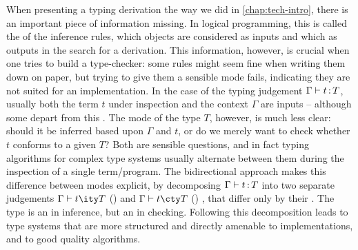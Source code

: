 
When presenting a typing derivation the way we did in \cref{chap:tech-intro}, there is
an important piece of information missing.
In logical programming, this is called the  of the inference rules,
\ie which objects are considered as inputs and which as outputs in the search
for a derivation.
This information, however, is crucial when one tries to build a type-checker:
some rules might seem fine when writing them down on paper, but trying to give them a
sensible mode fails, indicating they are not suited for an implementation.
In the case of the typing judgement $\Gamma \vdash t \operatorname{\mathrel{:}} T$,
usually both the term $t$ under inspection and the context $\Gamma$ are inputs –
although some depart from this .
The mode of the type $T$, however, is much less clear: should it be inferred based upon
$\Gamma$ and $t$, or do we merely want to check whether $t$ conforms to a given $T$?
Both are sensible questions, and in fact typing algorithms for complex type systems usually 
alternate between them during the inspection of a single term/program.
\AP The bidirectional approach makes this difference between modes explicit,
by decomposing %
$\Gamma \vdash t \operatorname{\mathrel{:}} T$ into two separate judgements $\inferty{\Gamma}{t}{T}$
() and $\checkty{\Gamma}{t}{T}$ ()%
,
that differ only by their . The type is an
 in inference, but an  in checking.
Following this decomposition%
%
%
leads to type systems that are more structured and directly amenable to implementations,
and to good quality algorithms.%

